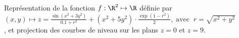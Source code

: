 \documentclass[class=report,crop=false]{standalone}
\begin{document}


\tableofcontents

\newcommand{\ou}{\mathscr{O}}
\newcommand{\f}{\mathscr{F}}
\newcommand{\mat}{\mathscr{M}}
\newcommand{\co}{\mathscr{C}}







\begin{figure}[!h]
    \caption{Représentation de la fonction $f: \R^2 \mapsto \R$ définie par
  $(x,y) \mapsto z=\frac{\sin \left( x^{2}+3y^{2} \right)}{0.1+r^{2}}+\left( x^{2}+5y^{2} \right)\cdot \frac{\exp \left( 1-r^{2} \right)}{2},\;\mathrm{avec}\;\; r=\sqrt{x^{2}+y^{2}}$,
et projection des courbes de niveau sur les plans $z=0$ et $z=9$.}
      \label{fig:Contours}
\end{figure}
\end{document}
